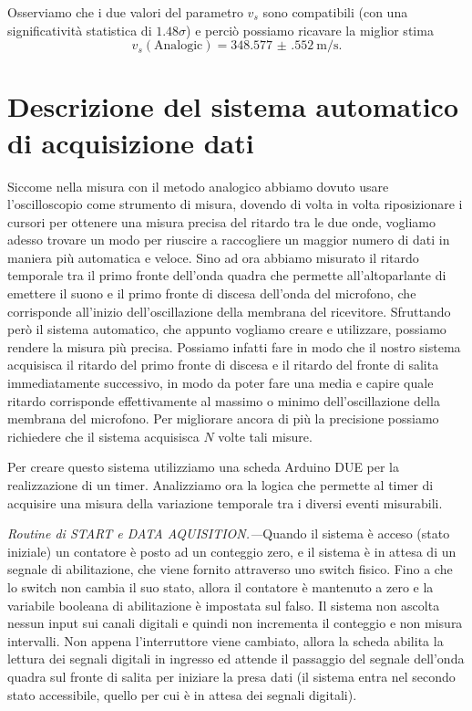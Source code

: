 \documentclass[
    rmp,
    reprint, 
    superscriptaddress, 
    altaffilletter, 
    amsmath, 
    amssymb, 
    a4paper,
    varvw]{revtex4-2}
\begin{document}
Osserviamo che i due valori del parametro $v_s$ sono compatibili (con una significatività statistica di $1.48\sigma$) e perciò possiamo ricavare la miglior stima \[v_s(\text{Analogic})=\SI{348.577(552)}{\metre\per\second}.\]

\section{Descrizione del sistema automatico di acquisizione dati}
Siccome nella misura con il metodo analogico abbiamo dovuto usare l'oscilloscopio come strumento di misura, dovendo di volta in volta riposizionare i cursori per ottenere una misura precisa del ritardo tra le due onde, vogliamo adesso trovare un modo per riuscire a raccogliere un maggior numero di dati in maniera più automatica e veloce.
Sino ad ora abbiamo misurato il ritardo temporale tra il primo fronte dell'onda quadra che permette all'altoparlante di emettere il suono e il primo fronte di discesa dell'onda del microfono, che corrisponde all'inizio dell'oscillazione della membrana del ricevitore. Sfruttando però il sistema automatico, che appunto vogliamo creare e utilizzare, possiamo rendere la misura più precisa. Possiamo infatti fare in modo che il nostro sistema acquisisca il ritardo del primo fronte di discesa e il ritardo del fronte di salita immediatamente successivo, in modo da poter fare una media e capire quale ritardo corrisponde effettivamente al massimo o minimo dell'oscillazione della membrana del microfono. Per migliorare ancora di più la precisione possiamo richiedere che il sistema acquisisca $N$ volte tali misure.

Per creare questo sistema utilizziamo una scheda Arduino DUE per la realizzazione di un timer.  Analizziamo ora la logica che permette al timer di acquisire una misura della variazione temporale tra i diversi eventi misurabili. 

\textit{Routine di \emph{START} e \emph{DATA AQUISITION}.---}Quando il sistema è acceso (stato iniziale) un contatore è posto ad un conteggio zero, e il sistema è in attesa di un segnale di abilitazione, che viene fornito attraverso uno switch fisico. Fino a che lo switch non cambia il suo stato, allora il contatore è mantenuto a zero e la variabile booleana di abilitazione è impostata sul falso. Il sistema non ascolta nessun input sui canali digitali e quindi non incrementa il conteggio e non misura intervalli. Non appena l'interruttore viene cambiato, allora la scheda abilita la lettura dei segnali digitali in ingresso ed attende il passaggio del segnale dell'onda quadra sul fronte di salita per iniziare la presa dati (il sistema entra nel secondo stato accessibile, quello per cui è in attesa dei segnali digitali).
\end{document}
